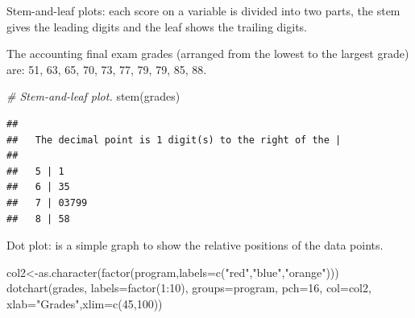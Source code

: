 \documentclass[
]{article}
\newcommand{\AttributeTok}[1]{\textcolor[rgb]{0.77,0.63,0.00}{#1}}
\newcommand{\CommentTok}[1]{\textcolor[rgb]{0.56,0.35,0.01}{\textit{#1}}}
\newcommand{\DecValTok}[1]{\textcolor[rgb]{0.00,0.00,0.81}{#1}}
\newcommand{\FunctionTok}[1]{\textcolor[rgb]{0.00,0.00,0.00}{#1}}
\newcommand{\NormalTok}[1]{#1}
\newcommand{\OtherTok}[1]{\textcolor[rgb]{0.56,0.35,0.01}{#1}}
\newcommand{\SpecialCharTok}[1]{\textcolor[rgb]{0.00,0.00,0.00}{#1}}
\newcommand{\StringTok}[1]{\textcolor[rgb]{0.31,0.60,0.02}{#1}}
\begin{document}
Stem-and-leaf plots: each score on a variable is divided into two parts,
the stem gives the leading digits and the leaf shows the trailing
digits.

The accounting final exam grades (arranged from the lowest to the
largest grade) are: 51, 63, 65, 70, 73, 77, 79, 79, 85, 88.

 

\begin{Highlighting}[]
\CommentTok{\# Stem{-}and{-}leaf plot.}
\FunctionTok{stem}\NormalTok{(grades)}
\end{Highlighting}

\begin{verbatim}
## 
##   The decimal point is 1 digit(s) to the right of the |
## 
##   5 | 1
##   6 | 35
##   7 | 03799
##   8 | 58
\end{verbatim}

Dot plot: is a simple graph to show the relative positions of the data
points.

\begin{Highlighting}[]
\NormalTok{col2}\OtherTok{\textless{}{-}}\FunctionTok{as.character}\NormalTok{(}\FunctionTok{factor}\NormalTok{(program,}\AttributeTok{labels=}\FunctionTok{c}\NormalTok{(}\StringTok{"red"}\NormalTok{,}\StringTok{"blue"}\NormalTok{,}\StringTok{"orange"}\NormalTok{)))}
\FunctionTok{dotchart}\NormalTok{(grades, }\AttributeTok{labels=}\FunctionTok{factor}\NormalTok{(}\DecValTok{1}\SpecialCharTok{:}\DecValTok{10}\NormalTok{), }\AttributeTok{groups=}\NormalTok{program, }\AttributeTok{pch=}\DecValTok{16}\NormalTok{, }\AttributeTok{col=}\NormalTok{col2, }\AttributeTok{xlab=}\StringTok{"Grades"}\NormalTok{,}\AttributeTok{xlim=}\FunctionTok{c}\NormalTok{(}\DecValTok{45}\NormalTok{,}\DecValTok{100}\NormalTok{))}
\end{Highlighting}
\end{document}
